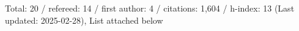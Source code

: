 Total: 20 / refereed: 14 / first author: 4 / citations: 1,604 / h-index: 13 (Last updated: 2025-02-28), List attached below
